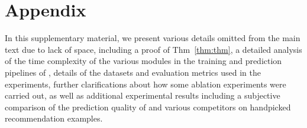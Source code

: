 \onecolumn

\section{Appendix}
In this supplementary material, we present various details omitted from the main text due to lack of space, including a proof of Thm~\ref{thm:thm}, a detailed analysis of the time complexity of the various modules in the training and prediction pipelines of \alg, details of the datasets and evaluation metrics used in the experiments, further clarifications about how some ablation experiments were carried out, as well as additional experimental results including a subjective comparison of the prediction quality of \alg and various competitors on handpicked recommendation examples.

% 








\clearpage


% 
% 
% 
% 
% 